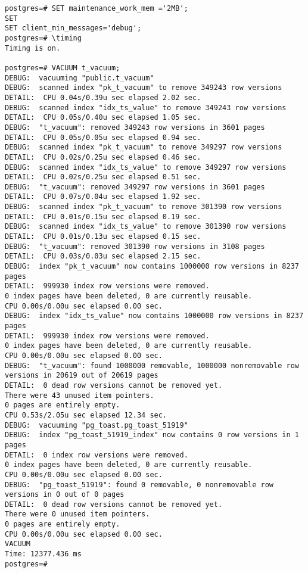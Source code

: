 \begin{lstlisting}[style=pgsql]
postgres=# SET maintenance_work_mem ='2MB';
SET
SET client_min_messages='debug';
postgres=# \timing
Timing is on.

postgres=# VACUUM t_vacuum;
DEBUG:  vacuuming "public.t_vacuum"
DEBUG:  scanned index "pk_t_vacuum" to remove 349243 row versions
DETAIL:  CPU 0.04s/0.39u sec elapsed 2.02 sec.
DEBUG:  scanned index "idx_ts_value" to remove 349243 row versions
DETAIL:  CPU 0.05s/0.40u sec elapsed 1.05 sec.
DEBUG:  "t_vacuum": removed 349243 row versions in 3601 pages
DETAIL:  CPU 0.05s/0.05u sec elapsed 0.94 sec.
DEBUG:  scanned index "pk_t_vacuum" to remove 349297 row versions
DETAIL:  CPU 0.02s/0.25u sec elapsed 0.46 sec.
DEBUG:  scanned index "idx_ts_value" to remove 349297 row versions
DETAIL:  CPU 0.02s/0.25u sec elapsed 0.51 sec.
DEBUG:  "t_vacuum": removed 349297 row versions in 3601 pages
DETAIL:  CPU 0.07s/0.04u sec elapsed 1.92 sec.
DEBUG:  scanned index "pk_t_vacuum" to remove 301390 row versions
DETAIL:  CPU 0.01s/0.15u sec elapsed 0.19 sec.
DEBUG:  scanned index "idx_ts_value" to remove 301390 row versions
DETAIL:  CPU 0.01s/0.13u sec elapsed 0.15 sec.
DEBUG:  "t_vacuum": removed 301390 row versions in 3108 pages
DETAIL:  CPU 0.03s/0.03u sec elapsed 2.15 sec.
DEBUG:  index "pk_t_vacuum" now contains 1000000 row versions in 8237 pages
DETAIL:  999930 index row versions were removed.
0 index pages have been deleted, 0 are currently reusable.
CPU 0.00s/0.00u sec elapsed 0.00 sec.
DEBUG:  index "idx_ts_value" now contains 1000000 row versions in 8237 pages
DETAIL:  999930 index row versions were removed.
0 index pages have been deleted, 0 are currently reusable.
CPU 0.00s/0.00u sec elapsed 0.00 sec.
DEBUG:  "t_vacuum": found 1000000 removable, 1000000 nonremovable row versions in 20619 out of 20619 pages
DETAIL:  0 dead row versions cannot be removed yet.
There were 43 unused item pointers.
0 pages are entirely empty.
CPU 0.53s/2.05u sec elapsed 12.34 sec.
DEBUG:  vacuuming "pg_toast.pg_toast_51919"
DEBUG:  index "pg_toast_51919_index" now contains 0 row versions in 1 pages
DETAIL:  0 index row versions were removed.
0 index pages have been deleted, 0 are currently reusable.
CPU 0.00s/0.00u sec elapsed 0.00 sec.
DEBUG:  "pg_toast_51919": found 0 removable, 0 nonremovable row versions in 0 out of 0 pages
DETAIL:  0 dead row versions cannot be removed yet.
There were 0 unused item pointers.
0 pages are entirely empty.
CPU 0.00s/0.00u sec elapsed 0.00 sec.
VACUUM
Time: 12377.436 ms
postgres=#



\end{lstlisting}

